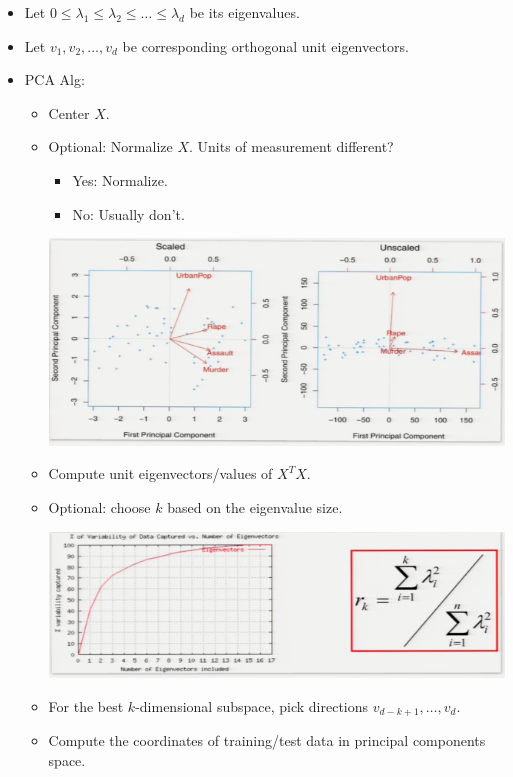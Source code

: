\documentclass[10pt]{article}
\begin{document}
\begin{itemize}
		\item Let $0 \leq \lambda_{1} \leq \lambda_{2} \leq \dots \leq \lambda_{d}$ be its eigenvalues.
		\item Let $v_{1}, v_{2}, \dots, v_{d}$ be corresponding orthogonal unit eigenvectors.
		\item PCA Alg:
			\begin{itemize}
				\item Center $X$.
				\item Optional: Normalize $X$. Units of measurement different?
					\begin{itemize}
						\item Yes: Normalize.
						\item No: Usually don't.
					\end{itemize}
					\begin{center}
						\includegraphics[scale=0.5]{../images/scaledcrime}
					\end{center}
				\item Compute unit eigenvectors/values of $X^{T}X$.
				\item Optional: choose $k$ based on the eigenvalue size.
					\begin{center}
						\includegraphics[scale=0.5]{../images/dimensionratio}
					\end{center}
				\item For the best $k$-dimensional subspace, pick directions $v_{d-k+1}, \dots, v_{d}$.
				\item Compute the coordinates of training/test data in principal components space.

\end{itemize}
\end{itemize}
\end{document}
